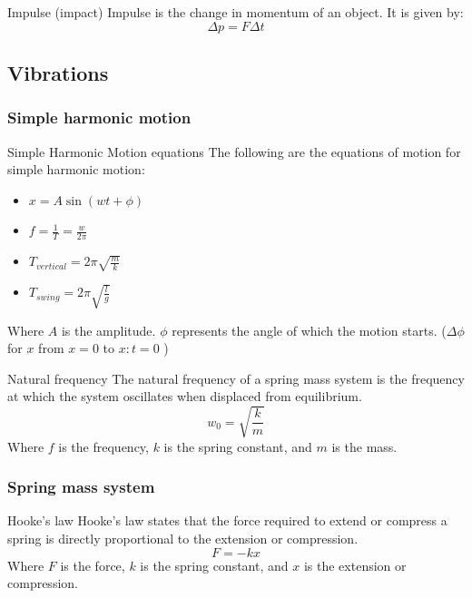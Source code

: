 \begin{definition}
    {Impulse (impact)}
    Impulse is the change in momentum of an object. It is given by:
    \[\Delta p=F\Delta t\]
\end{definition}

\subsection{Vibrations}

\subsubsection{Simple harmonic motion}
\begin{theorem}
    {Simple Harmonic Motion equations}
    The following are the equations of motion for simple harmonic motion:
    \begin{itemize}
        \item $x=A\sin(wt+\phi)$
        \item $f=\frac{1}{T}=\frac{w}{2\pi}$
        \item $T_{vertical} = 2\pi\sqrt{\frac{m}{k}}$
        \item $T_{swing} = 2\pi\sqrt{\frac{l}{g}}$
    \end{itemize}
    Where $A$ is the amplitude. $\phi$ represents the angle of which the motion starts. ($\Delta\phi$ for $x$ from $x=0$ to $x:t=0$ )
\end{theorem}

\begin{definition}
    {Natural frequency}
    The natural frequency of a spring mass system is the frequency at which the system oscillates when displaced from equilibrium.
    \[w_0=\sqrt{\frac{k}{m}}\]
    Where $f$ is the frequency, $k$ is the spring constant, and $m$ is the mass.
\end{definition}

\subsubsection{Spring mass system}

\begin{definition}
    {Hooke's law}
    Hooke's law states that the force required to extend or compress a spring is directly proportional to the extension or compression.
    \[F=-kx\]
    Where $F$ is the force, $k$ is the spring constant, and $x$ is the extension or compression.
\end{definition}

